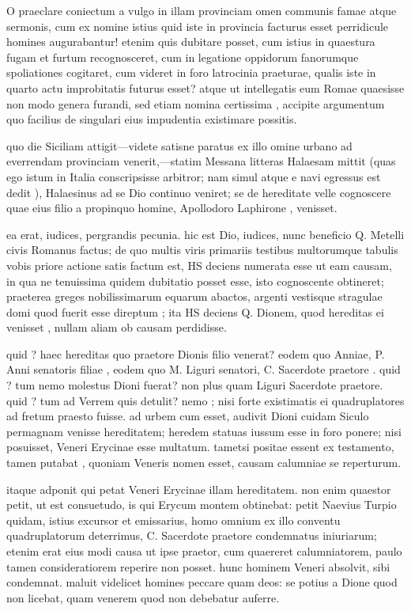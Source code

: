  O praeclare coniectum a vulgo in illam provinciam omen communis famae atque sermonis, cum ex nomine istius quid iste in provincia facturus esset perridicule homines augurabantur! etenim quis dubitare posset, cum istius in quaestura fugam et furtum recognosceret, cum in legatione oppidorum fanorumque spoliationes cogitaret, cum videret in foro latrocinia praeturae, qualis iste in quarto actu improbitatis futurus esset? atque ut intellegatis eum Romae quaesisse non modo genera furandi, sed etiam nomina certissima , accipite argumentum quo facilius de singulari eius impudentia existimare possitis.

 quo die Siciliam attigit—videte satisne paratus ex illo omine urbano ad everrendam provinciam venerit,—statim Messana litteras Halaesam mittit (quas ego istum in Italia conscripsisse arbitror; nam simul atque e navi egressus est dedit ), Halaesinus ad se Dio continuo veniret; se de hereditate velle cognoscere quae eius filio a propinquo homine, Apollodoro Laphirone , venisset.

 ea erat, iudices, pergrandis pecunia. hic est Dio, iudices, nunc beneficio Q. Metelli civis Romanus factus; de quo multis viris primariis testibus multorumque tabulis vobis priore actione satis factum est, HS deciens numerata esse ut eam causam, in qua ne tenuissima quidem dubitatio posset esse, isto cognoscente obtineret; praeterea greges nobilissimarum equarum abactos, argenti vestisque stragulae domi quod fuerit esse direptum ; ita HS deciens Q. Dionem, quod hereditas ei venisset , nullam aliam ob causam perdidisse.

 quid ? haec hereditas quo praetore Dionis filio venerat? eodem quo Anniae, P. Anni senatoris filiae , eodem quo M. Liguri senatori, C. Sacerdote praetore . quid ? tum nemo molestus Dioni fuerat? non plus quam Liguri Sacerdote praetore. quid ? tum ad Verrem quis detulit? nemo ; nisi forte existimatis ei quadruplatores ad fretum praesto fuisse. ad urbem cum esset, audivit Dioni cuidam Siculo permagnam venisse hereditatem; heredem statuas iussum esse in foro ponere; nisi posuisset, Veneri Erycinae esse multatum. tametsi positae essent ex testamento, tamen putabat , quoniam Veneris nomen esset, causam calumniae se reperturum.

 itaque adponit qui petat Veneri Erycinae illam hereditatem. non enim quaestor petit, ut est consuetudo, is qui Erycum montem obtinebat: petit Naevius Turpio quidam, istius excursor et emissarius, homo omnium ex illo conventu quadruplatorum deterrimus, C. Sacerdote praetore condemnatus iniuriarum; etenim erat eius modi causa ut ipse praetor, cum quaereret calumniatorem, paulo tamen consideratiorem reperire non posset. hunc hominem Veneri absolvit, sibi condemnat. maluit videlicet homines peccare quam deos: se potius a Dione quod non licebat, quam venerem quod non debebatur auferre.

